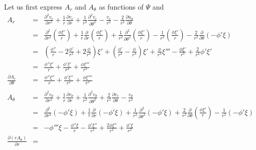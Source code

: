Let us first express $A_r$ and $A_\theta$ as functions of $\Psi$
and 
\begin{eqnarray}
A_r 
&=& 
\frac{\partial^2 v_r}{\partial r^2} 
+ \frac{1}{r} \frac{\partial v_r}{\partial r} +   
\frac{1}{r^2} \frac{\partial^2 v_r}{\partial \theta^2}
- \frac{v_r}{r^2} 
- \frac{2}{r^2} \frac{\partial u_\theta}{\partial \theta} \\ 
&=& 
\frac{\partial^2 }{\partial r^2}  (\frac{\phi \xi'}{r})
+ \frac{1}{r} \frac{\partial }{\partial r}  (\frac{\phi \xi'}{r})  
+\frac{1}{r^2} \frac{\partial^2 }{\partial \theta^2}(\frac{\phi \xi'}{r})
- \frac{1}{r^2} (\frac{\phi \xi'}{r})
- \frac{2}{r^2} \frac{\partial }{\partial \theta} (-\phi' \xi) \\
&=& 
(\frac{\phi''}{r} - 2\frac{\phi'}{r^2} +  2\frac{\phi}{r^3} )\xi'
+ (\frac{\phi'}{r^2} - \frac{\phi}{r^3} )  \xi' 
+\frac{\phi }{r^3} \xi'''  
-  \frac{\phi \xi'}{r^3}
+ \frac{2}{r^2} \phi' \xi' \\
&=&
\frac{\phi'' \xi'}{r} + \frac{\phi' \xi'}{r^2} + \frac{\phi\xi''' }{r^3} \\
\frac{\partial A_r}{\partial \theta} &=& 
\frac{\phi'' \xi''}{r} + \frac{\phi' \xi''}{r^2} + \frac{\phi\xi'''' }{r^3} \\
\\
A_\theta 
&=&
\frac{\partial^2 v_\theta}{\partial r^2} 
+ \frac{1}{r} \frac{\partial v_\theta}{\partial r} 
+ \frac{1}{r^2} \frac{\partial^2 v_\theta}{\partial \theta^2}
+\frac{2}{r^2} \frac{\partial v_r}{\partial \theta} 
- \frac{v_\theta}{r^2} \\
&=&
\frac{\partial^2 }{\partial r^2}(-\phi' \xi) 
+ \frac{1}{r} \frac{\partial }{\partial r} (-\phi' \xi)
+ \frac{1}{r^2} \frac{\partial^2 }{\partial \theta^2}(-\phi' \xi)
+\frac{2}{r^2} \frac{\partial }{\partial \theta} (\frac{\phi \xi'}{r})
- \frac{1}{r^2} (-\phi' \xi) \\
&=& - \phi''' \xi 
- \frac{\phi'' \xi}{r} 
- \frac{\phi' \xi''}{r^2} 
+\frac{2 \phi \xi''}{r^2} 
+  \frac{\phi' \xi}{r^2} \\
\frac{\partial (r A_\theta)}{\partial r} &=& 
\end{eqnarray}






\newpage


